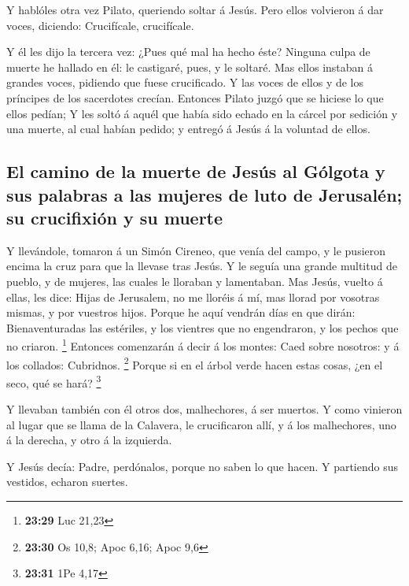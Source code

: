  Y hablóles otra vez Pilato, queriendo soltar á Jesús.
 Pero ellos volvieron á dar voces, diciendo: Crucifícale,
crucifícale.

 Y él les dijo la tercera vez: ¿Pues qué mal ha hecho éste?
Ninguna culpa de muerte he hallado en él: le castigaré, pues, y le
soltaré.  Mas ellos instaban á grandes voces, pidiendo que
fuese crucificado. Y las voces de ellos y de los príncipes de los
sacerdotes crecían.  Entonces Pilato juzgó que se hiciese
lo que ellos pedían;  Y les soltó á aquél que había sido
echado en la cárcel por sedición y una muerte, al cual habían pedido; y
entregó á Jesús á la voluntad de ellos.

\hypertarget{el-camino-de-la-muerte-de-jesuxfas-al-guxf3lgota-y-sus-palabras-a-las-mujeres-de-luto-de-jerusaluxe9n-su-crucifixiuxf3n-y-su-muerte}{%
\subsection{El camino de la muerte de Jesús al Gólgota y sus palabras a
las mujeres de luto de Jerusalén; su crucifixión y su
muerte}\label{el-camino-de-la-muerte-de-jesuxfas-al-guxf3lgota-y-sus-palabras-a-las-mujeres-de-luto-de-jerusaluxe9n-su-crucifixiuxf3n-y-su-muerte}}

 Y llevándole, tomaron á un Simón Cireneo, que venía del
campo, y le pusieron encima la cruz para que la llevase tras Jesús.
 Y le seguía una grande multitud de pueblo, y de mujeres,
las cuales le lloraban y lamentaban.  Mas Jesús, vuelto á
ellas, les dice: Hijas de Jerusalem, no me lloréis á mí, mas llorad por
vosotras mismas, y por vuestros hijos.  Porque he aquí
vendrán días en que dirán: Bienaventuradas las estériles, y los vientres
que no engendraron, y los pechos que no criaron. \footnote{\textbf{23:29}
  Luc 21,23}  Entonces comenzarán á decir á los montes:
Caed sobre nosotros: y á los collados: Cubridnos. \footnote{\textbf{23:30}
  Os 10,8; Apoc 6,16; Apoc 9,6}  Porque si en el árbol
verde hacen estas cosas, ¿en el seco, qué se hará? \footnote{\textbf{23:31}
  1Pe 4,17}

 Y llevaban también con él otros dos, malhechores, á ser
muertos.  Y como vinieron al lugar que se llama de la
Calavera, le crucificaron allí, y á los malhechores, uno á la derecha, y
otro á la izquierda.

 Y Jesús decía: Padre, perdónalos, porque no saben lo que
hacen. Y partiendo sus vestidos, echaron suertes.

